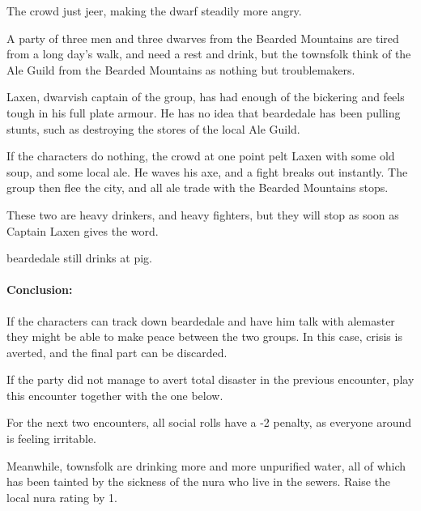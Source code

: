 \begin{multicols}{2}
\begin{boxtext}
	The crowd just jeer, making the dwarf steadily more angry.
\end{boxtext}

A party of three men and three dwarves from the Bearded Mountains are tired from a long day's walk, and need a rest and drink, but the townsfolk think of the Ale Guild from the Bearded Mountains as nothing but troublemakers.

Laxen, dwarvish captain of the group, has had enough of the bickering and feels tough in his full plate armour.  He has no idea that \gls{beardedale} has been pulling stunts, such as destroying the stores of the local Ale Guild.

If the characters do nothing, the crowd at one point pelt Laxen with some old soup, and some local ale.  He waves his axe, and a fight breaks out instantly.  The group then flee the city, and all ale trade with the Bearded Mountains stops.

\dwarvensoldier


These two are heavy drinkers, and heavy fighters, but they will stop as soon as Captain Laxen gives the word.

\dwarventrader


\humansoldier

\Gls{beardedale} still drinks at \gls{pig}.  

\paragraph{Conclusion:} If the characters can track down \gls{beardedale} and have him talk with \gls{alemaster} they might be able to make peace between the two groups.  In this case, crisis is averted, and the final part can be discarded.


If the party did not manage to avert total disaster in the previous encounter, play this encounter together with the one below.

For the next two encounters, all social rolls have a -2 penalty, as everyone around is feeling irritable.

Meanwhile, townsfolk are drinking more and more unpurified water, all of which has been tainted by the sickness of the nura who live in the sewers.  Raise the local nura rating by 1.


\end{multicols}
